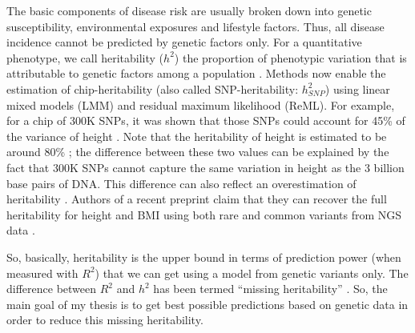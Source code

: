The basic components of disease risk are usually broken down into genetic susceptibility, environmental exposures and lifestyle factors. Thus, all disease incidence cannot be predicted by genetic factors only.
For a quantitative phenotype, we call heritability ($h^2$) the proportion of phenotypic variation that is attributable to genetic factors among a population \cite[]{visscher2008heritability}.
Methods now enable the estimation of chip-heritability (also called SNP-heritability: $h^2_{SNP}$) using linear mixed models (LMM) and residual maximum likelihood (ReML). For example, for a chip of 300K SNPs, it was shown that those SNPs could account for 45\% of the variance of height \cite[]{yang2010common}.
Note that the heritability of height is estimated to be around 80\% \cite[]{silventoinen2003determinants,visscher2006assumption}; the difference between these two values can be explained by the fact that 300K SNPs cannot capture the same variation in height as the 3 billion base pairs of DNA. This difference can also reflect an overestimation of heritability \cite[]{visscher2008heritability}. Authors of a recent preprint claim that they can recover the full heritability for height and BMI using both rare and common variants from NGS data \cite[]{wainschtein2019recovery}.

So, basically, heritability is the upper bound in terms of prediction power (when measured with $R^2$) that we can get using a model from genetic variants only.
The difference between $R^2$ and $h^2$ has been termed ``missing heritability'' \cite[]{manolio2009finding}. So, the main goal of my thesis is to get best possible predictions based on genetic data in order to reduce this missing heritability.

